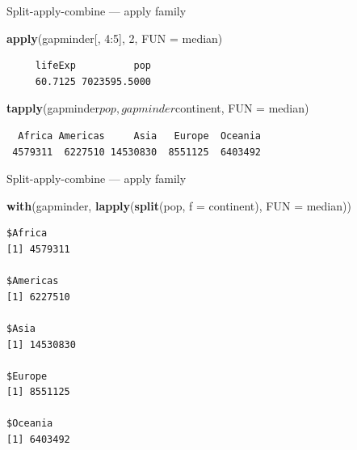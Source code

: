 \documentclass[10pt,ignorenonframetext,compress, aspectratio=169]{beamer}
\newenvironment{Shaded}{\begin{snugshade}}{\end{snugshade}}
\newcommand{\KeywordTok}[1]{\textcolor[rgb]{0.13,0.29,0.53}{\textbf{{#1}}}}
\newcommand{\DataTypeTok}[1]{\textcolor[rgb]{0.13,0.29,0.53}{{#1}}}
\newcommand{\DecValTok}[1]{\textcolor[rgb]{0.00,0.00,0.81}{{#1}}}
\newcommand{\NormalTok}[1]{{#1}}
\begin{document}
\begin{frame}[fragile]{Split-apply-combine --- apply family}

\scriptsize

\begin{Shaded}
\begin{Highlighting}[]
\KeywordTok{apply}\NormalTok{(gapminder[, }\DecValTok{4}\NormalTok{:}\DecValTok{5}\NormalTok{], }\DecValTok{2}\NormalTok{, }\DataTypeTok{FUN =} \NormalTok{median)}
\end{Highlighting}
\end{Shaded}

\begin{verbatim}
     lifeExp          pop 
     60.7125 7023595.5000 
\end{verbatim}

\begin{Shaded}
\begin{Highlighting}[]
\KeywordTok{tapply}\NormalTok{(gapminder$pop, gapminder$continent, }\DataTypeTok{FUN =} \NormalTok{median)}
\end{Highlighting}
\end{Shaded}

\begin{verbatim}
  Africa Americas     Asia   Europe  Oceania 
 4579311  6227510 14530830  8551125  6403492 
\end{verbatim}

\normalsize

\end{frame}

\begin{frame}[fragile]{Split-apply-combine --- apply family}

\scriptsize

\begin{Shaded}
\begin{Highlighting}[]
\KeywordTok{with}\NormalTok{(gapminder, }\KeywordTok{lapply}\NormalTok{(}\KeywordTok{split}\NormalTok{(pop, }\DataTypeTok{f =} \NormalTok{continent), }\DataTypeTok{FUN =} \NormalTok{median))}
\end{Highlighting}
\end{Shaded}

\begin{verbatim}
$Africa
[1] 4579311

$Americas
[1] 6227510

$Asia
[1] 14530830

$Europe
[1] 8551125

$Oceania
[1] 6403492
\end{verbatim}

\end{frame}
\end{document}

